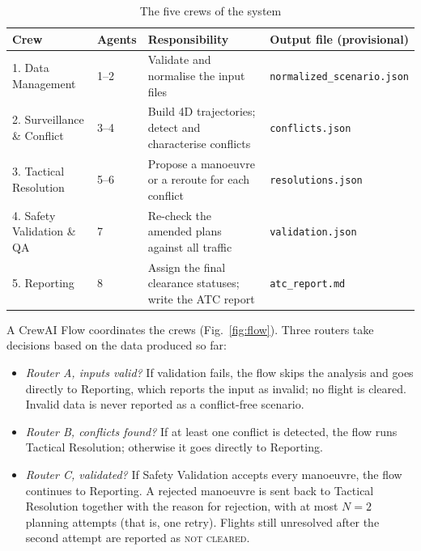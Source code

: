 \begin{table}[H]
\centering
\caption{The five crews of the system}
\label{tab:crews}
\small
\begin{tabularx}{\linewidth}{@{}l l X l@{}}
\toprule
\textbf{Crew} & \textbf{Agents} & \textbf{Responsibility} & \textbf{Output file (provisional)} \\
\midrule
1. Data Management          & 1--2 & Validate and normalise the input files                         & \texttt{normalized\_scenario.json} \\
2. Surveillance \& Conflict & 3--4 & Build 4D trajectories; detect and characterise conflicts        & \texttt{conflicts.json} \\
3. Tactical Resolution      & 5--6 & Propose a manoeuvre or a reroute for each conflict              & \texttt{resolutions.json} \\
4. Safety Validation \& QA  & 7    & Re-check the amended plans against all traffic                 & \texttt{validation.json} \\
5. Reporting                & 8    & Assign the final clearance statuses; write the ATC report      & \texttt{atc\_report.md} \\
\bottomrule
\end{tabularx}
\end{table}

A CrewAI Flow coordinates the crews (Fig.~\ref{fig:flow}). Three routers take decisions based on the data produced so far:
\begin{itemize}
    \item \emph{Router A, inputs valid?} If validation fails, the flow skips the analysis and goes directly to Reporting, which reports the input as invalid; no flight is cleared. Invalid data is never reported as a conflict-free scenario.
    \item \emph{Router B, conflicts found?} If at least one conflict is detected, the flow runs Tactical Resolution; otherwise it goes directly to Reporting.
    \item \emph{Router C, validated?} If Safety Validation accepts every manoeuvre, the flow continues to Reporting. A rejected manoeuvre is sent back to Tactical Resolution together with the reason for rejection, with at most $N = 2$ planning attempts (that is, one retry). Flights still unresolved after the second attempt are reported as \textsc{not cleared}.
\end{itemize}

